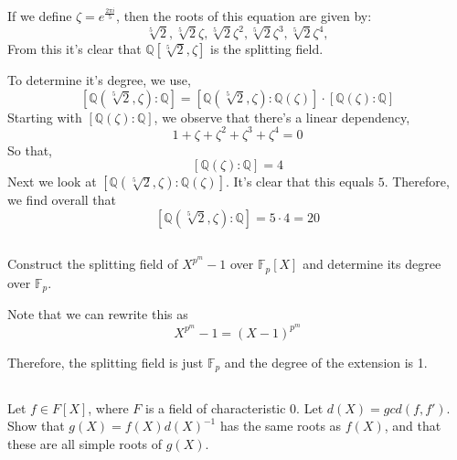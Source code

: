 \documentclass{article}
\begin{document}
If we define \(\zeta = e^{\frac{2\pi i}{5}}\), then the roots of this equation are given by:
\begin{equation}
\sqrt[5]{2}, \sqrt[5]{2}\zeta, \sqrt[5]{2}\zeta^{2}, \sqrt[5]{2}\zeta^{3}, \sqrt[5]{2}\zeta^{4},
\end{equation}
From this it's clear that \(\mathbb{Q}\left[\sqrt[5]{2}, \zeta\right]\) is the splitting field.

To determine it's degree, we use,
\begin{equation}
\left[\mathbb{Q}(\sqrt[5]{2}, \zeta) : \mathbb{Q}\right] = \left[\mathbb{Q}(\sqrt[5]{2}, \zeta) : \mathbb{Q}(\zeta) \right] \cdot \left[\mathbb{Q}(\zeta) : \mathbb{Q} \right]
\end{equation}
Starting with \(\left[\mathbb{Q}(\zeta) : \mathbb{Q} \right]\), we observe that there's a linear dependency,
\begin{equation}
1 + \zeta + \zeta^{2} + \zeta^{3} + \zeta^{4} = 0
\end{equation}
So that,
\begin{equation}
\left[\mathbb{Q}(\zeta) : \mathbb{Q} \right] = 4
\end{equation}
Next we look at $ \left[\mathbb{Q}(\sqrt[5]{2}, \zeta) : \mathbb{Q}(\zeta) \right] $. It's clear that this equals \(5\). Therefore, we find overall that
\begin{equation}
\left[\mathbb{Q}(\sqrt[5]{2}, \zeta) : \mathbb{Q}\right] = 5 \cdot 4 = 20
\end{equation}

\subsection{}
Construct the splitting field of \(X^{p^{m}}-1\) over \(\mathbb{F}_{p}\left[X\right]\) and determine its degree over  \(\mathbb{F}_{p}\).

Note that we can rewrite this as
\begin{equation}
X^{p^{m}} - 1 = (X-1)^{p^{m}}
\end{equation}

Therefore, the splitting field is just \(\mathbb{F}_{p}\) and the degree of the extension is 1.

\subsection{}
Let \(f \in F\left[X\right]\), where \(F\) is a field of characteristic 0. Let \(d(X) = gcd(f, f')\). Show that \(g(X) = f(X)d(X)^{-1}\) has the same roots as \(f(X)\), and that these are all simple roots of \(g(X)\).
\end{document}
